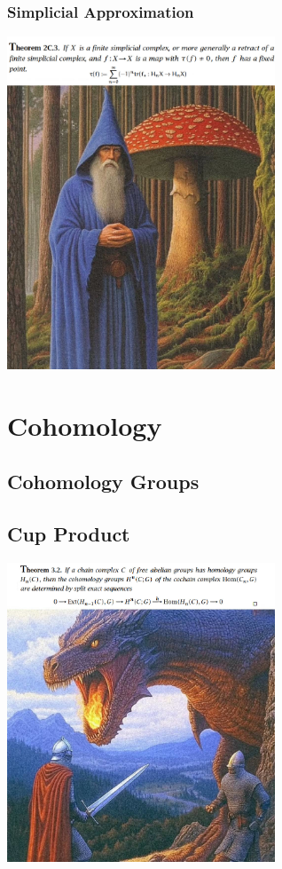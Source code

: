 \documentclass[11pt, a4paper, final]{amsart}
\numberwithin{theorem}{section}
\theoremstyle{definition}
\theoremstyle{remark}
\begin{document}
\subsubsection{Simplicial Approximation}

\begin{center}
    \includegraphics[width=80mm]{lefschetz_number.jpg}
\end{center}

\section{Cohomology}
\subsection{Cohomology Groups}
\subsection{Cup Product}

\begin{center}
    \includegraphics[width=80mm]{cohomology_coefficients.jpg}
\end{center}
\end{document}
